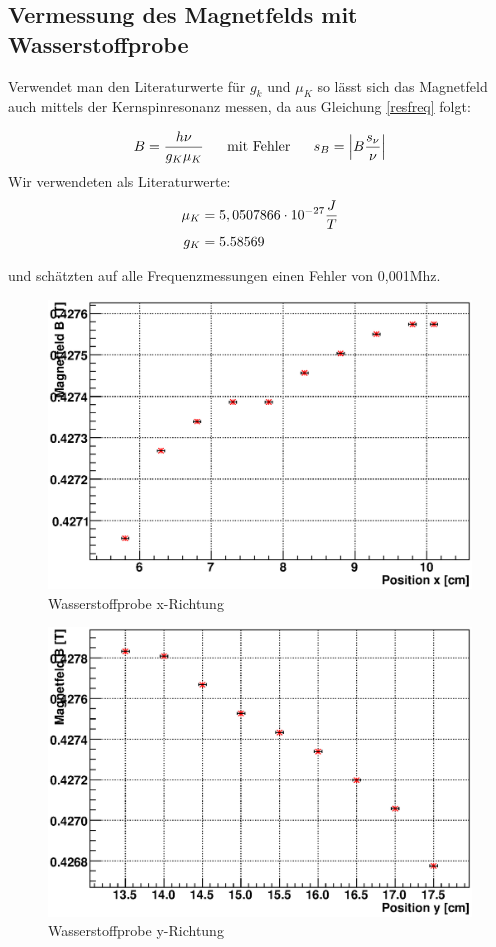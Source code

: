 \documentclass[12pt]{article}
\begin{document}
\subsection{Vermessung des Magnetfelds mit Wasserstoffprobe}
Verwendet man den Literaturwerte für $g_k$ und $\mu_K$ so lässt sich das Magnetfeld auch mittels der Kernspinresonanz messen, da aus Gleichung \ref{resfreq} folgt:

\begin{align}
 B = \frac{h \nu}{g_K \mu_K}~~~~~\textnormal{mit Fehler}~~~~~s_B= \left| B \frac{s_{\nu}}{\nu} \right|
\end{align}
Wir verwendeten als Literaturwerte:
\begin{align}
 \notag \mu_K &= 5,0507866\cdot 10^{-27} \frac{J}{T} \\
 \notag g_K &= 5.58569
\end{align}

und schätzten auf alle Frequenzmessungen einen Fehler von 0,001Mhz.

\begin{figure}[H]
\centering
\includegraphics[width=0.9\linewidth]{pictures/wasser_x.eps}
\caption{Wasserstoffprobe x-Richtung}
\end{figure}

\begin{figure}[H]
\centering
\includegraphics[width=0.9\linewidth]{pictures/wasser_y.eps}
\caption{Wasserstoffprobe y-Richtung}
\end{figure}
\end{document}
